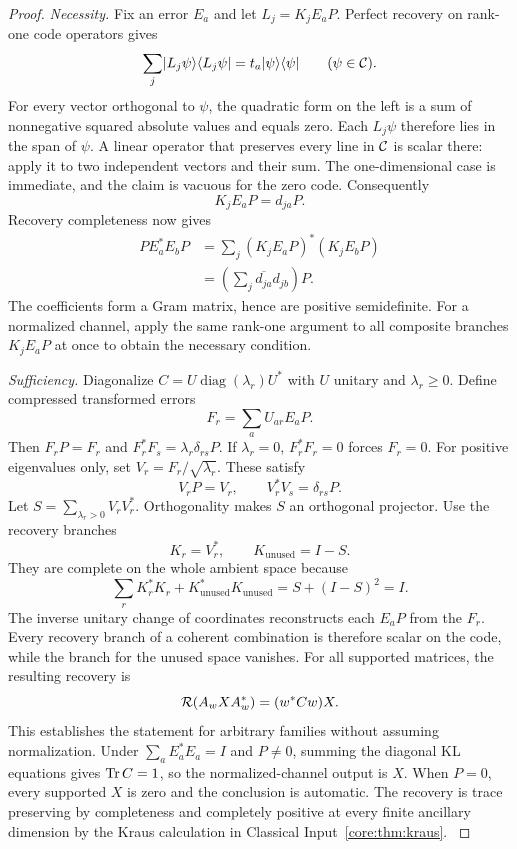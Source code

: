 \begin{proof}\label{core:proof:016}
\textit{Necessity.} Fix an error $E_a$ and let $L_j=K_jE_aP$. Perfect recovery on rank-one code operators gives
\[
\sum_j\ket{L_j\psi}\bra{L_j\psi}
=t_a\ket\psi\bra\psi\qquad(\psi\in\cC).
\]
For every vector orthogonal to $\psi$, the quadratic form on the left is a sum of nonnegative squared absolute values and equals zero. Each $L_j\psi$ therefore lies in the span of $\psi$. A linear operator that preserves every line in $\cC$ is scalar there: apply it to two independent vectors and their sum. The one-dimensional case is immediate, and the claim is vacuous for the zero code. Consequently
\[
K_jE_aP=d_{ja}P.
\]
Recovery completeness now gives
\[
\begin{aligned}
PE_a^*E_bP
&=\sum_j (K_jE_aP)^*(K_jE_bP)\\
&=\left(\sum_j\overline{d_{ja}}d_{jb}\right)P.
\end{aligned}
\]
The coefficients form a Gram matrix, hence are positive semidefinite. For a normalized channel, apply the same rank-one argument to all composite branches $K_jE_aP$ at once to obtain the necessary condition.

\textit{Sufficiency.} Diagonalize $C=U\operatorname{diag}(\lambda_r)U^*$ with $U$ unitary and $\lambda_r\ge0$. Define compressed transformed errors
\[
F_r=\sum_aU_{ar}E_aP.
\]
Then $F_rP=F_r$ and $F_r^*F_s=\lambda_r\delta_{rs}P$. If $\lambda_r=0$, $F_r^*F_r=0$ forces $F_r=0$. For positive eigenvalues only, set $V_r=F_r/\sqrt{\lambda_r}$. These satisfy
\[
V_rP=V_r,\qquad V_r^*V_s=\delta_{rs}P.
\]
Let $S=\sum_{\lambda_r>0}V_rV_r^*$. Orthogonality makes $S$ an orthogonal projector. Use the recovery branches
\[
K_r=V_r^*,\qquad K_{\mathrm{unused}}=I-S.
\]
They are complete on the whole ambient space because
\[
\sum_rK_r^*K_r+K_{\mathrm{unused}}^*K_{\mathrm{unused}}
=S+(I-S)^2=I.
\]
The inverse unitary change of coordinates reconstructs each $E_aP$ from the $F_r$. Every recovery branch of a coherent combination is therefore scalar on the code, while the branch for the unused space vanishes. For all supported matrices, the resulting recovery is
\[
\cR(A_wXA_w^*)=(w^*Cw)X.
\]
This establishes the statement for arbitrary families without assuming normalization. Under $\sum_aE_a^*E_a=I$ and $P\ne0$, summing the diagonal KL equations gives $\operatorname{Tr} C=1$, so the normalized-channel output is $X$. When $P=0$, every supported $X$ is zero and the conclusion is automatic. The recovery is trace preserving by completeness and completely positive at every finite ancillary dimension by the Kraus calculation in Classical Input~\ref{core:thm:kraus}.
\label{core:proof:016:end}\end{proof}

